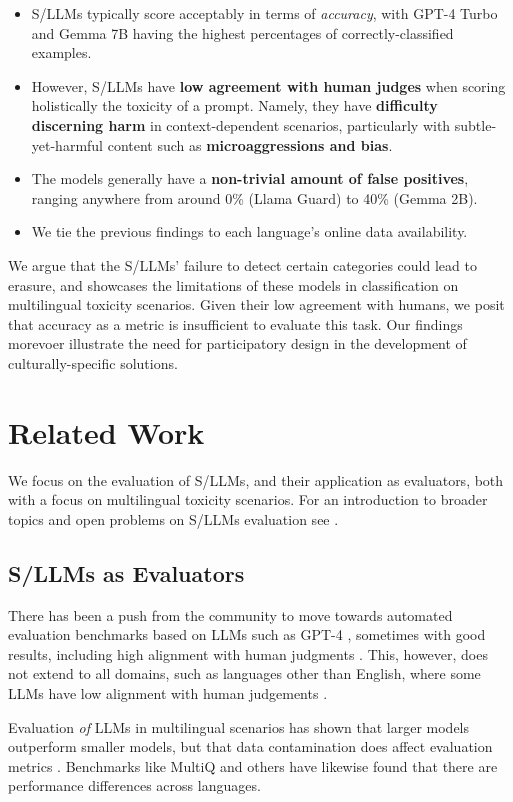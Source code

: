 \begin{itemize}
    \item S/LLMs typically score acceptably in terms of \emph{accuracy}, with GPT-4 Turbo and Gemma 7B having the highest percentages of correctly-classified examples. 
    \item However, S/LLMs have \textbf{low agreement with human judges} when scoring holistically the toxicity of a prompt. Namely, they have \textbf{difficulty discerning harm} in context-dependent scenarios, particularly with subtle-yet-harmful content such as \textbf{microaggressions and bias}. 
    \item The models generally have a \textbf{non-trivial amount of false positives}, ranging anywhere from around 0\% (Llama Guard) to 40\% (Gemma 2B). 
    \item We tie the previous findings to each language's online data availability. 
\end{itemize}
We argue that the S/LLMs' failure to detect certain categories could lead to erasure, and showcases the limitations of these models in classification on multilingual toxicity scenarios. 
Given their low agreement with humans, we posit that accuracy as a metric is insufficient to evaluate this task. 
Our findings morevoer illustrate the need for participatory design in the development of culturally-specific solutions.

\section{Related Work}
\label{sec:background}
We focus on the evaluation of S/LLMs, and their application as evaluators, both with a focus on multilingual toxicity scenarios. 
For an introduction to broader topics and open problems on S/LLMs evaluation see \citet{LLMEvalSurvey}. 

\subsection{S/LLMs as Evaluators}
There has been a push from the community to move towards automated evaluation benchmarks based on LLMs such as GPT-4 \cite{rethinkingsemantic,NEURIPS2023_91f18a12}, sometimes with good results, including high alignment with human judgments \cite{rethinkingsemantic}. 
This, however, does not extend to all domains, such as languages other than English, where some LLMs have low alignment with human judgements \citep{LLMLXEval}. 

Evaluation \textit{of} LLMs in multilingual scenarios has shown that larger models outperform smaller models, but that data contamination does affect evaluation metrics \citep{megaverse}. Benchmarks like MultiQ \cite{multiq} and others \cite{lai-etal-2023-chatgpt,megaverse,LLMLXEval} have likewise found that there are performance differences across languages. 

